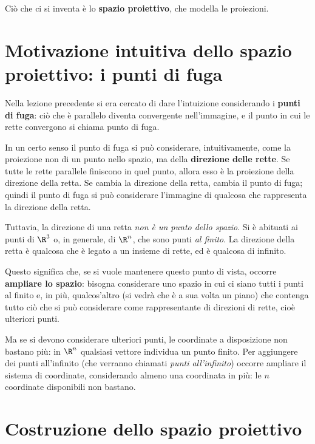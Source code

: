 Ciò che ci si inventa è lo \textbf{spazio proiettivo}, che modella le proiezioni.

\section{Motivazione intuitiva dello spazio proiettivo: i punti di fuga}

Nella lezione precedente si era cercato di dare l'intuizione considerando i \textbf{punti di fuga}: ciò che è parallelo diventa convergente nell'immagine, e il punto in cui le rette convergono si chiama punto di fuga.

In un certo senso il punto di fuga si può considerare, intuitivamente, come la proiezione non di un punto nello spazio, ma della \textbf{direzione delle rette}. Se tutte le rette parallele finiscono in quel punto, allora esso è la proiezione della direzione della retta. Se cambia la direzione della retta, cambia il punto di fuga; quindi il punto di fuga si può considerare l'immagine di qualcosa che rappresenta la direzione della retta.

Tuttavia, la direzione di una retta \emph{non è un punto dello spazio}. Si è abituati ai punti di $\R^3$ o, in generale, di $\R^n$, che sono punti \emph{al finito}. La direzione della retta è qualcosa che è legato a un insieme di rette, ed è qualcosa di infinito.

Questo significa che, se si vuole mantenere questo punto di vista, occorre \textbf{ampliare lo spazio}: bisogna considerare uno spazio in cui ci siano tutti i punti al finito e, in più, qualcos'altro (si vedrà che è a sua volta un piano) che contenga tutto ciò che si può considerare come rappresentante di direzioni di rette, cioè ulteriori punti.

Ma se si devono considerare ulteriori punti, le coordinate a disposizione non bastano più: in $\R^n$ qualsiasi vettore individua un punto finito. Per aggiungere dei punti all'infinito (che verranno chiamati \emph{punti all'infinito}) occorre ampliare il sistema di coordinate, considerando almeno una coordinata in più: le $n$ coordinate disponibili non bastano.

\section{Costruzione dello spazio proiettivo}


